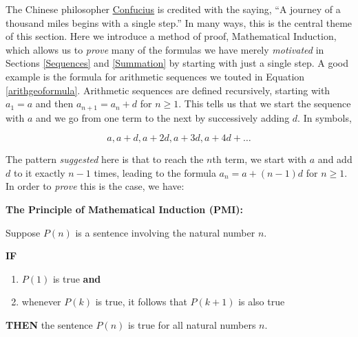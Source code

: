 \documentclass{ximera}
\begin{document}
	\author{Stitz-Zeager}




\setcounter{footnote}{0}

\label{Induction}

The Chinese philosopher \href{http://en.wikipedia.org/wiki/Confucius}{\underline{Confucius}} is credited with the saying, ``A journey of a thousand miles begins with a single step.''  In many ways, this is the central theme of this section.  Here we introduce a method of proof, Mathematical Induction, which allows us to \textit{prove} many of the formulas we have merely \textit{motivated} in Sections \ref{Sequences} and \ref{Summation} by starting with just a single step.  A good example is the formula for arithmetic sequences we touted in Equation \ref{arithgeoformula}.  Arithmetic sequences are defined recursively, starting with $a_{1} = a$ and then $a_{n+1} = a_{n} + d$ for $n \geq 1$.  This tells us that we start the sequence with  $a$ and we go from one term to the next by successively adding $d$.  In symbols,

\[ a, a+d, a+2d, a + 3d, a + 4d +  \ldots\]

The pattern \textit{suggested} here is  that to reach the $n$th term, we start with $a$ and add $d$ to it exactly $n-1$ times, leading to the formula $a_{n} = a + (n-1)d$ for $n \geq 1$.  In order to  \textit{prove} this is the case, we have:

\smallskip

\colorbox{ResultColor}{\bbm

\label{PMI} \textbf{The Principle of Mathematical Induction (PMI):}  

Suppose $P(n)$ is a sentence involving the natural number $n$. 

\smallskip

\textbf{IF}

\begin{enumerate}

\item  $P(1)$ is true \textbf{and}

\item  whenever $P(k)$ is true, it follows that $P(k+1)$ is also true

\end{enumerate}

\textbf{THEN} the sentence $P(n)$ is true for all natural numbers $n$.

\ebm}
\end{document}
